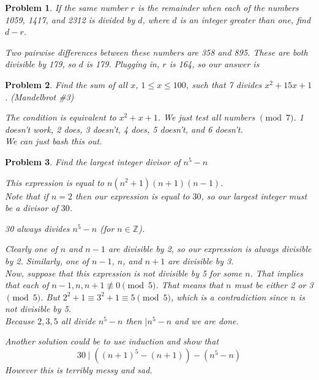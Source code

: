\documentclass{scrartcl}
\newtheorem{a_problem}{Problem}
\begin{document}
\begin{a_problem}
	If the same number $r$ is the remainder when each of the numbers 1059, 1417, and 2312 is divided by $d$, where $d$ is an integer greater than one, find $d-r$.
	\begin{soln}
		Two pairwise differences between these numbers are 358 and 895. These are both divisible by 179, so $d$ is 179. Plugging in, $r$ is 164, so our answer is 
	\end{soln}
\end{a_problem}

\begin{a_problem}
	Find the sum of all $x$, $1 \leq x \leq 100$, such that 7 divides $x^2 + 15x + 1$. (Mandelbrot \#3)
	\begin{soln}
		The condition is equivalent to $x^2 + x + 1$.
		We just test all numbers $\pmod{7}$.
		1 doesn't work, 2 does, 3 doesn't, 4 does, 5 doesn't, and 6 doesn't. \\
		We can just bash this out.
	\end{soln}
\end{a_problem}

\begin{a_problem}
	Find the largest integer divisor of $n^5 - n$
	\begin{soln}
		This expression is equal to $n(n^2+1)(n+1)(n-1)$. \\
		Note that if $n=2$ then our expression is equal to $30$, so our largest integer must be a divisor of $30$. 
		\begin{claim*}
		30 always divides $n^5 - n$ (for $n \in \mathbb{Z}$). 
		\end{claim*}
		Clearly one of $n$ and $n-1$ are divisible by 2, so our expression is always divisible by 2. Similarly, one of $n-1$, $n$, and $n+1$ are divisible by 3. \\
		Now, suppose that this expression is not divisible by 5 for some $n$.
		That implies that each of $n-1, n, n+1 \not\equiv 0 \pmod{5}$.
		That means that $n$ must be either 2 or 3 $\pmod{5}$.
		But $2^2 + 1 \equiv 3^2 + 1 \equiv 5 \pmod{5}$, which is a contradiction since $n$ is not divisible by 5. \\
		Because $2,3,5$ all divide $n^5 - n$ then $\mid n^5 - n$ and we are done.
	\end{soln}
	\begin{remark}
		Another solution could be to use induction and show that 
		\[30 \mid ({(n+1)}^5 - (n+1)) - (n^5 - n)\]
		However this is terribly messy and sad.
	\end{remark}
\end{a_problem}
\end{document}
